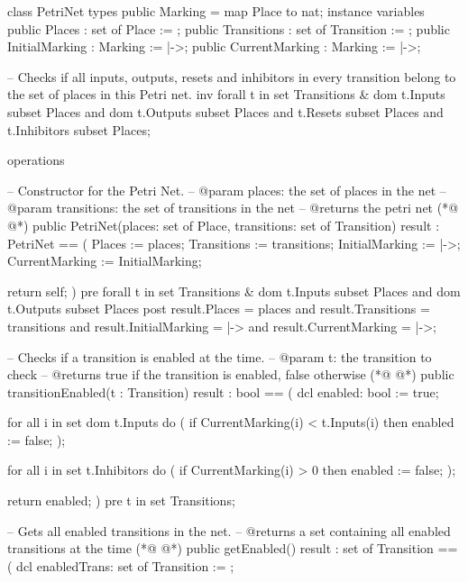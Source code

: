 \begin{vdmpp}
class PetriNet
types
 public Marking = map Place to nat;
instance variables
 public Places : set of Place := {};
 public Transitions : set of Transition := {};
 public InitialMarking : Marking  := {|->};
 public CurrentMarking : Marking := {|->};
 
 -- Checks if all inputs, outputs, resets and inhibitors in every transition belong to the set of places in this Petri net.
 inv forall t in set Transitions & dom t.Inputs subset Places and
                  dom t.Outputs subset Places and
                  t.Resets subset Places and
                  t.Inhibitors subset Places;

 
operations


 -- Constructor for the Petri Net.
 -- @param places: the set of places in the net
 -- @param transitions: the set of transitions in the net
 -- @returns the petri net
(*@
\label{PetriNet:24}
@*)
 public PetriNet(places: set of Place, transitions: set of Transition) result : PetriNet == (
      Places := places;
      Transitions := transitions;
      InitialMarking := {|->};
      CurrentMarking := InitialMarking;
      
      return self;    
 )
 pre forall t in set Transitions & dom t.Inputs subset Places and
                  dom t.Outputs subset Places
 post result.Places = places and result.Transitions = transitions and 
        result.InitialMarking = {|->} and result.CurrentMarking = {|->};
     
        
        
 -- Checks if a transition is enabled at the time.
 -- @param t: the transition to check
 -- @returns true if the transition is enabled, false otherwise
(*@
\label{transitionEnabled:42}
@*)
 public transitionEnabled(t : Transition) result : bool == (
  dcl enabled: bool := true;
  
  for all i in set dom t.Inputs do (
   if CurrentMarking(i) < t.Inputs(i) then enabled := false;
  );
  
  for all i in set t.Inhibitors do (
   if CurrentMarking(i) > 0 then enabled := false;
  );
  
  return enabled;
 )
 pre t in set Transitions;
 
 
 
 -- Gets all enabled transitions in the net.
 -- @returns a set containing all enabled transitions at the time
(*@
\label{getEnabled:61}
@*)
 public getEnabled() result : set of Transition == (
  dcl enabledTrans: set of Transition := {};
  

\end{vdmpp}

